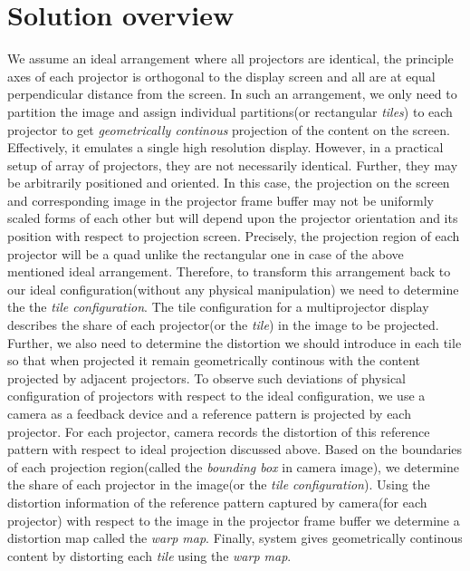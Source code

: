 \documentclass[letterpaper,10pt,conference]{/home/pranav/Desktop/Publication_work/latex_class_files/IEEEtran}
\begin{document}
\section{Solution overview}
We assume an ideal arrangement where all projectors are identical, the principle axes of each projector is orthogonal to the display screen and all are at equal perpendicular distance from the screen. In such an arrangement, we only need to partition the image and assign individual partitions(or rectangular \textit{tiles}) to each projector to get \textit{geometrically continous} projection of the content on the screen. Effectively, it emulates a single high resolution display.\newline
However, in a practical setup of array of projectors, they are not necessarily identical. Further, they may be arbitrarily positioned and oriented. In this case, the projection on the screen and corresponding image in the projector frame buffer may not be uniformly scaled forms of each other but will depend upon the projector orientation and its position with respect to projection screen. Precisely, the projection region of each projector will be a quad unlike the rectangular one in case of the above mentioned ideal arrangement.\newline
Therefore, to transform this arrangement back to our ideal configuration(without any physical manipulation) we need to determine the the \textit{tile configuration}. The tile configuration for a multiprojector display describes the share of each projector(or the \textit{tile}) in the image to be projected. Further, we also need to determine the distortion we should introduce in each tile so that when projected it remain geometrically continous with the content projected by adjacent projectors.\newline
To observe such deviations of physical configuration of projectors with respect to the ideal configuration, we use a camera as a feedback device and a reference pattern is projected by each projector. For each projector, camera records the distortion of this reference pattern with respect to ideal projection discussed above. Based on the boundaries of each projection region(called the \textit{bounding box} in camera image), we determine the share of each projector in the image(or the \textit{tile configuration}). Using the distortion information of the reference pattern captured by camera(for each projector) with respect to the image in the projector frame buffer we determine a distortion map called the \textit{warp map}. Finally, system gives geometrically continous content by distorting each \textit{tile} using the \textit{warp map}.\newline 
\end{document}
